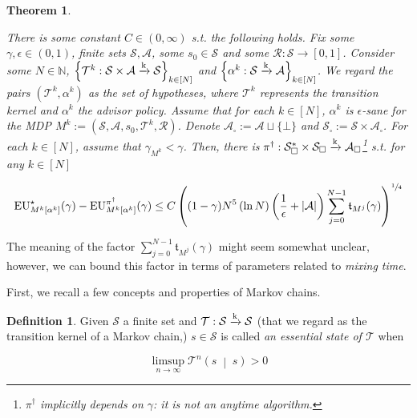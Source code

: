 \documentclass[11pt]{article}
\theoremstyle{definition}
\newtheorem{definition}{Definition}%
\theoremstyle{plain}
\newtheorem{theorem}{Theorem}%
\newcommand{\AP}[1]{\left(#1\right)}
\newcommand{\AB}[1]{\left[#1\right]}
\newcommand{\AC}[1]{\left\{#1\right\}}
\newcommand{\APM}[2]{\left(#1\;\middle\vert\;#2\right)}
\newcommand{\Nats}{\mathbb{N}}
\newcommand{\Abs}[1]{\left\vert #1 \right\vert}
\newcommand{\K}{\xrightarrow{\textnormal{k}}}
\newcommand{\A}{\mathcal{A}}
\newcommand{\St}{\mathcal{S}}
\newcommand{\T}{\mathcal{T}}
\newcommand{\R}{\mathcal{R}}
\newcommand{\EU}{\operatorname{EU}}
\newcommand{\Tn}{\mathfrak{t}}
\newcommand{\Ad}{\alpha}
\begin{document}
\begin{samepage}
\begin{theorem}
\label{thm:main}

There is some constant $C \in (0,\infty)$ s.t. the following holds. Fix some $\gamma,\epsilon \in (0,1)$, finite sets $\St,\A$, some $s_0 \in \St$ and some $\R: \St \rightarrow [0,1]$. Consider some $N \in \Nats$, $\AC{\T^k: \St \times \A \K \St}_{k\in[N]}$ and $\AC{\Ad^k :\St \K \A}_{k\in[N]}$. We regard the pairs $(\T^k,\Ad^k)$ as the set of \emph{hypotheses}, where $\T^k$ represents the transition kernel and $\Ad^k$ the advisor policy. Assume that for each $k\in[N]$, $\Ad^k$ is $\epsilon$-sane for the MDP $M^k:=\AP{\St,\A,s_0,\T^k,\R}$. Denote $\A_\square:=\A\sqcup\{\bot\}$ and $\St_\square:=\St \times \A_\square$. For each $k \in [N]$, assume that $\gamma_{M^k} < \gamma$. Then, there is $\pi^\dagger: \St_\square^* \times \St_\square \K \A_\square$\footnote{$\pi^\dagger$ implicitly depends on $\gamma$: it is \emph{not} an anytime algorithm.} s.t. for any $k \in [N]$

\begin{equation}
\EU_{M^k\AB{\Ad^k}}^\star(\gamma) - \EU_{M^k\AB{\Ad^k}}^{\pi^\dagger}(\gamma) \leq C\AP{(1-\gamma)N^5 \AP{\ln N} \AP{\frac{1}{\epsilon}+\Abs{\A}}\sum_{j=0}^{N-1} \Tn_{M^j}(\gamma)}^{\sfrac{1}{4}}
\end{equation}

\end{theorem}
\end{samepage}

The meaning of the factor $\sum_{j=0}^{N-1} \Tn_{M^j}(\gamma)$ might seem somewhat unclear, however, we can bound this factor in terms of parameters related to \emph{mixing time}. 

First, we recall a few concepts and properties of Markov chains.

\begin{samepage}
\begin{definition}

Given $\St$ a finite set and $\T: \St \K \St$ (that we regard as the transition kernel of a Markov chain,) $s \in \St$ is called \emph{an essential state of $\T$} when

\begin{equation}
\limsup_{n \rightarrow \infty} {\T^n\APM{s}{s}} > 0
\end{equation}

\end{definition}
\end{samepage}
\end{document}
